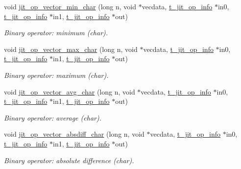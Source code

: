 \begin{DoxyCompactItemize}
void \hyperlink{group__opvecmod_ga276550a47face9505e6b9faf385a3ffb}{jit\_\-op\_\-vector\_\-min\_\-char} (long n, void $\ast$vecdata, \hyperlink{structt__jit__op__info}{t\_\-jit\_\-op\_\-info} $\ast$in0, \hyperlink{structt__jit__op__info}{t\_\-jit\_\-op\_\-info} $\ast$in1, \hyperlink{structt__jit__op__info}{t\_\-jit\_\-op\_\-info} $\ast$out)
\begin{DoxyCompactList}\small\item\em Binary operator: minimum (char). \item\end{DoxyCompactList}\item 
void \hyperlink{group__opvecmod_gae96a69930932256e39d2e637d3b97f80}{jit\_\-op\_\-vector\_\-max\_\-char} (long n, void $\ast$vecdata, \hyperlink{structt__jit__op__info}{t\_\-jit\_\-op\_\-info} $\ast$in0, \hyperlink{structt__jit__op__info}{t\_\-jit\_\-op\_\-info} $\ast$in1, \hyperlink{structt__jit__op__info}{t\_\-jit\_\-op\_\-info} $\ast$out)
\begin{DoxyCompactList}\small\item\em Binary operator: maximum (char). \item\end{DoxyCompactList}\item 
void \hyperlink{group__opvecmod_ga68eefadefa7143d0d6e34fa12e5b5a9c}{jit\_\-op\_\-vector\_\-avg\_\-char} (long n, void $\ast$vecdata, \hyperlink{structt__jit__op__info}{t\_\-jit\_\-op\_\-info} $\ast$in0, \hyperlink{structt__jit__op__info}{t\_\-jit\_\-op\_\-info} $\ast$in1, \hyperlink{structt__jit__op__info}{t\_\-jit\_\-op\_\-info} $\ast$out)
\begin{DoxyCompactList}\small\item\em Binary operator: average (char). \item\end{DoxyCompactList}\item 
void \hyperlink{group__opvecmod_ga8e524cd5872ab508e3e85bade504a427}{jit\_\-op\_\-vector\_\-absdiff\_\-char} (long n, void $\ast$vecdata, \hyperlink{structt__jit__op__info}{t\_\-jit\_\-op\_\-info} $\ast$in0, \hyperlink{structt__jit__op__info}{t\_\-jit\_\-op\_\-info} $\ast$in1, \hyperlink{structt__jit__op__info}{t\_\-jit\_\-op\_\-info} $\ast$out)
\begin{DoxyCompactList}\small\item\em Binary operator: absolute difference (char). \item\end{DoxyCompactList}\item 

\end{DoxyCompactItemize}
